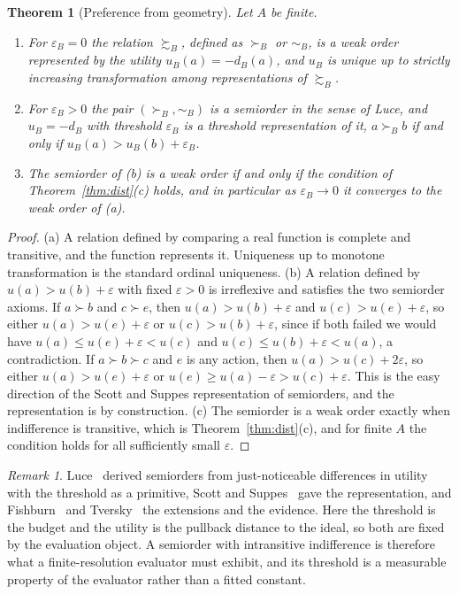 \documentclass[11pt]{article}
\newtheorem{theorem}{Theorem}
\theoremstyle{definition}
\theoremstyle{remark}
\newtheorem*{remark}{Remark}
\begin{document}
\begin{theorem}[Preference from geometry]
\label{thm:pref}
Let $A$ be finite.
\begin{enumerate}
\item[(a)] For $\varepsilon_{B}=0$ the relation $\succsim_{B}$, defined as $\succ_{B}$ or $\sim_{B}$, is a weak order represented by the utility $u_{B}(a)=-d_{B}(a)$, and $u_{B}$ is unique up to strictly increasing transformation among representations of $\succsim_{B}$.
\item[(b)] For $\varepsilon_{B}>0$ the pair $(\succ_{B},\sim_{B})$ is a semiorder in the sense of Luce, and $u_{B}=-d_{B}$ with threshold $\varepsilon_{B}$ is a threshold representation of it, $a\succ_{B}b$ if and only if $u_{B}(a)>u_{B}(b)+\varepsilon_{B}$.
\item[(c)] The semiorder of (b) is a weak order if and only if the condition of Theorem~\ref{thm:dist}(c) holds, and in particular as $\varepsilon_{B}\to0$ it converges to the weak order of (a).
\end{enumerate}
\end{theorem}

\begin{proof}
(a) A relation defined by comparing a real function is complete and transitive, and the function represents it. Uniqueness up to monotone transformation is the standard ordinal uniqueness.
(b) A relation defined by $u(a)>u(b)+\varepsilon$ with fixed $\varepsilon>0$ is irreflexive and satisfies the two semiorder axioms. If $a\succ b$ and $c\succ e$, then $u(a)>u(b)+\varepsilon$ and $u(c)>u(e)+\varepsilon$, so either $u(a)>u(e)+\varepsilon$ or $u(c)>u(b)+\varepsilon$, since if both failed we would have $u(a)\le u(e)+\varepsilon<u(c)$ and $u(c)\le u(b)+\varepsilon<u(a)$, a contradiction. If $a\succ b\succ c$ and $e$ is any action, then $u(a)>u(c)+2\varepsilon$, so either $u(a)>u(e)+\varepsilon$ or $u(e)\ge u(a)-\varepsilon>u(c)+\varepsilon$. This is the easy direction of the Scott and Suppes representation of semiorders, and the representation is by construction.
(c) The semiorder is a weak order exactly when indifference is transitive, which is Theorem~\ref{thm:dist}(c), and for finite $A$ the condition holds for all sufficiently small $\varepsilon$.
\end{proof}

\begin{remark}
Luce~\cite{luce1956} derived semiorders from just-noticeable differences in utility with the threshold as a primitive, Scott and Suppes~\cite{scott1958} gave the representation, and Fishburn~\cite{fishburn1970} and Tversky~\cite{tversky1969} the extensions and the evidence.
Here the threshold is the budget and the utility is the pullback distance to the ideal, so both are fixed by the evaluation object.
A semiorder with intransitive indifference is therefore what a finite-resolution evaluator must exhibit, and its threshold is a measurable property of the evaluator rather than a fitted constant.
\end{remark}
\end{document}
